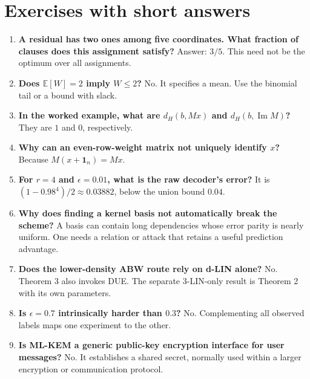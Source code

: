 \documentclass[11pt,a4paper]{article}
\newcommand{\E}{\mathbb E}
\newcommand{\Image}{\operatorname{Im}}
\newcommand{\one}{\mathbf 1}
\begin{document}
\section{Exercises with short answers}
\begin{enumerate}
\item \textbf{A residual has two ones among five coordinates. What fraction of clauses does this assignment satisfy?} Answer: $3/5$. This need not be the optimum over all assignments.
\item \textbf{Does $\E[W]=2$ imply $W\leq2$?} No. It specifies a mean. Use the binomial tail or a bound with slack.
\item \textbf{In the worked example, what are $d_H(b,Mx)$ and $d_H(b,\Image M)$?} They are $1$ and $0$, respectively.
\item \textbf{Why can an even-row-weight matrix not uniquely identify $x$?} Because $M(x+\one_n)=Mx$.
\item \textbf{For $r=4$ and $\epsilon=0.01$, what is the raw decoder's error?} It is $(1-0.98^4)/2\approx0.03882$, below the union bound $0.04$.
\item \textbf{Why does finding a kernel basis not automatically break the scheme?} A basis can contain long dependencies whose error parity is nearly uniform. One needs a relation or attack that retains a useful prediction advantage.
\item \textbf{Does the lower-density ABW route rely on d-LIN alone?} No. Theorem 3 also invokes DUE. The separate 3-LIN-only result is Theorem 2 with its own parameters.
\item \textbf{Is $\epsilon=0.7$ intrinsically harder than $0.3$?} No. Complementing all observed labels maps one experiment to the other.
\item \textbf{Is ML-KEM a generic public-key encryption interface for user messages?} No. It establishes a shared secret, normally used within a larger encryption or communication protocol.
\end{enumerate}
\end{document}
